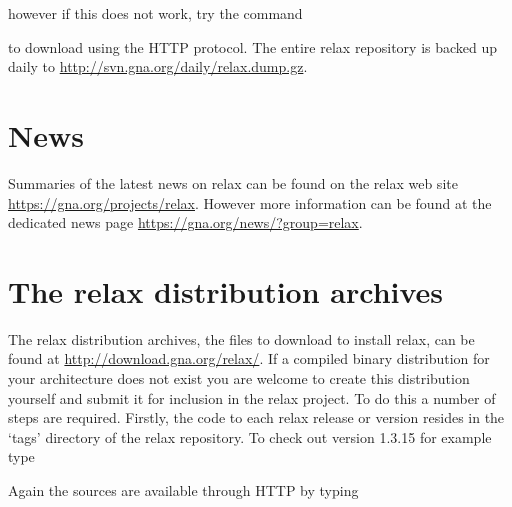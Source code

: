 
however if this does not work, try the command


to download using the HTTP protocol.  The entire relax repository is backed up daily to \href{http://svn.gna.org/daily/relax.dump.gz}{http://svn.gna.org/daily/relax.dump.gz}.




\section{News}

Summaries of the latest news on relax can be found on the relax web site \href{https://gna.org/projects/relax}{https://gna.org/projects/relax}.  However more information can be found at the dedicated news page \href{https://gna.org/news/?group=relax}{https://gna.org/news/?group=relax}.




\section{The relax distribution archives}

The relax distribution archives, the files to download to install relax, can be found at \href{http://download.gna.org/relax/}{http://download.gna.org/relax/}.  If a compiled binary distribution for your architecture does not exist you are welcome to create this distribution yourself and submit it for inclusion in the relax project.  To do this a number of steps are required.  Firstly, the code to each relax release or version resides in the `tags' directory of the relax repository.  To check out version 1.3.15 for example type


Again the sources are available through HTTP by typing


